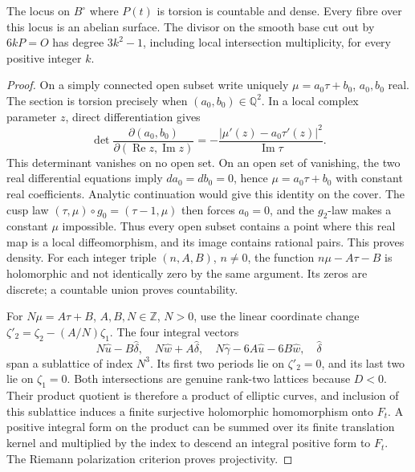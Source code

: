 \begin{proposition}\label{fam:src:D.1.2}\label{fam:st:D.1.2}
The locus on \(B^\circ\) where \(P(t)\) is torsion is countable and dense.
Every fibre over this locus is an abelian surface. The divisor on the
smooth base cut out by \(6kP=O\) has degree \(3k^2-1\), including local
intersection multiplicity, for every positive integer \(k\).
\end{proposition}
\begin{proof}
On a simply connected open subset write uniquely
\(\mu=a_0\tau+b_0\), \(a_0,b_0\) real. The section is torsion precisely
when \((a_0,b_0)\in\mathbb Q^2\). In a local complex parameter \(z\), direct
differentiation gives
\[
 \det\frac{\partial(a_0,b_0)}{\partial(\operatorname{Re}z,
 \operatorname{Im}z)}
 =-\frac{|\mu'(z)-a_0\tau'(z)|^2}{\operatorname{Im}\tau}.
\]
This determinant vanishes on no open set. On an open set of vanishing,
the two real differential equations imply \(da_0=db_0=0\), hence
\(\mu=a_0\tau+b_0\) with constant real coefficients. Analytic continuation
would give this identity on the cover. The cusp law
\((\tau,\mu)\circ g_0=(\tau-1,\mu)\) then forces \(a_0=0\), and the
\(g_2\)-law makes a constant \(\mu\) impossible. Thus every open subset
contains a point where this real map is a local diffeomorphism, and its
image contains rational pairs. This proves density. For each integer
triple \((n,A,B)\), \(n\ne0\), the function \(n\mu-A\tau-B\) is
holomorphic and not identically zero by the same argument. Its zeros are
discrete; a countable union proves countability.

For \(N\mu=A\tau+B\), \(A,B,N\in\mathbb Z\), \(N>0\), use the linear
coordinate change \(\zeta'_2=\zeta_2-(A/N)\zeta_1\).
The four integral vectors
\[
 N\widehat u-B\widehat\delta,\quad
 N\widehat w+A\widehat\delta,\quad
 N\widehat\gamma-6A\widehat u-6B\widehat w,\quad
 \widehat\delta
\]
span a sublattice of index \(N^3\). Its first two periods lie on
\(\zeta'_2=0\), and its last two lie on \(\zeta_1=0\).
Both intersections are genuine rank-two lattices because \(D<0\).
Their product quotient is therefore a product of elliptic curves, and
inclusion of this sublattice induces a finite surjective holomorphic
homomorphism onto \(F_t\). A positive integral form on the product can
be summed over its finite translation kernel and multiplied by the
index to descend an integral positive form to \(F_t\). The Riemann
polarization criterion proves projectivity.


\end{proof}
